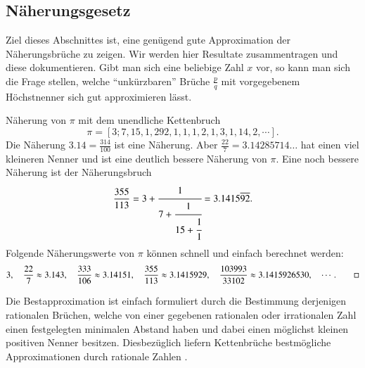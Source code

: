 \subsection{Näherungsgesetz}
%
Ziel dieses Abschnittes ist, eine genügend gute Approximation der
Näherungsbrüche zu zeigen. Wir werden hier Resultate zusammentragen und 
diese dokumentieren. Gibt man sich eine beliebige Zahl $x$
vor, so kann man sich die Frage stellen, welche ``unkürzbaren'' Brüche
$\frac{p}{q}$ mit vorgegebenem Höchstnenner sich gut approximieren
lässt. 
\begin{beispiel}
%
Näherung von $\pi$ mit dem unendliche Kettenbruch
\[
\pi
=
[3;7,15,1,292,1,1,1,2,1,3,1,14,2,\cdots].
\]
Die Näherung $3.14 = \frac{314}{100}$ ist eine Näherung.
Aber $\frac{22}{7} = 3.14285714\dots$ hat einen viel kleineren Nenner und
ist eine deutlich bessere Näherung von $\pi$.
Eine noch bessere Näherung ist der Näherungsbruch
\begin{equation}
\frac{355}{113}
=
3 + \cfrac{1}{7+\cfrac{1}{15+\cfrac{1}{1}}}
=
3.1415\overline{92}.
\end{equation}
Folgende Näherungswerte von $\pi$ können schnell und einfach berechnet werden:
\begin{equation*}
3, \quad
\frac{22}{7} \approx 3.143, \quad
\frac{333}{106} \approx 3.14151, \quad
\frac{355}{113} \approx 3.1415929, \quad
\frac{103993}{33102} \approx 3.1415926530, \quad
\cdots.
\qedhere
\end{equation*}
\end{beispiel}
Die Bestapproximation ist einfach formuliert durch die Bestimmung
%
derjenigen rationalen Brüchen, welche von einer gegebenen rationalen
oder irrationalen Zahl einen festgelegten minimalen Abstand haben
und dabei einen möglichst kleinen positiven Nenner besitzen. Diesbezüglich liefern Kettenbrüche
bestmögliche Approximationen durch rationale Zahlen
\cite{kettenbruch:numerical-analysis}.

